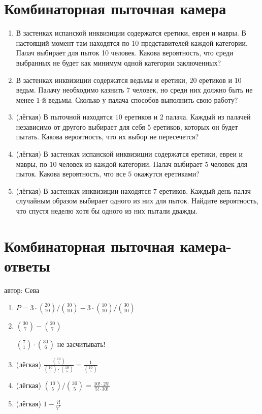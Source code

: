 \documentclass[a4paper,12pt]{article}
\begin{document}
\newpage
\section{Комбинаторная пыточная камера} %

\begin{enumerate} %
\item
В застенках испанской инквизиции содержатся еретики, евреи и мавры. В настоящий момент там находятся по 10 представителей каждой категории. Палач выбирает для пыток 10 человек. Какова вероятность, что среди выбранных не будет как минимум одной категории заключенных?
\item
В застенках инквизиции содержатся ведьмы и еретики, $20$ еретиков и $10$ ведьм. Палачу необходимо казнить $7$ человек, но среди них должно быть не менее $1$-й ведьмы. Сколько у палача способов выполнить свою работу?
\item (лёгкая)
В пыточной находятся $10$ еретиков и $2$ палача. Каждый из палачей независимо от другого выбирает для себя $5$ еретиков, которых он будет пытать. Какова вероятность, что их выбор не пересечется?
\item (лёгкая)
В застенках испанской инквизиции содержатся еретики, евреи и мавры, по $10$ человек из каждой категории. Палач выбирает $5$ человек для пыток. Какова вероятность, что все $5$ окажутся еретиками?
\item (лёгкая)
В застенках инквизиции находятся $7$ еретиков. Каждый день палач случайным образом выбирает одного из них для пыток. Найдите вероятность, что спустя неделю хотя бы одного из них пытали дважды.
\end{enumerate}

\newpage
\section{Комбинаторная пыточная камера-ответы}
автор: Сева

\begin{enumerate}
\item
$P=3\cdot\binom{20}{10}/\binom{30}{10}-3\cdot\binom{10}{10}/\binom{30}{10}$
\item
$\binom{30}{7}-\binom{20}{7}$

$\binom{7}{1}\cdot\binom{30}{6}$ не засчитывать!
\item (лёгкая)
$\frac{\binom{10}{5}}{\binom{10}{5}\cdot\binom{10}{5}}=\frac{1}{\binom{10}{5}}$
\item (лёгкая)
$\binom{10}{5}/\binom{30}{5}=\frac{10!\cdot25!}{5!\cdot30!}$
\item (лёгкая)
$1-\frac{7!}{7^7}$
\end{enumerate}
\end{document}
